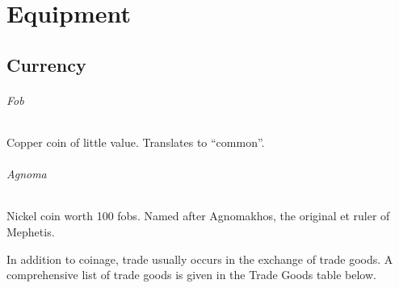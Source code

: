 \chapter{Equipment} \label{ch::equipment}
\section*{Currency} \label{sec::currency}
    \subparagraph{Fob}
        Copper coin of little value.
        Translates to ``common''.
    \subparagraph{Agnoma}
        Nickel coin worth 100 fobs.
        Named after Agnomakhos, the original et ruler of Mephetis.

    In addition to coinage, trade usually occurs in the exchange of trade goods.
    A comprehensive list of trade goods is given in the Trade Goods table below.

